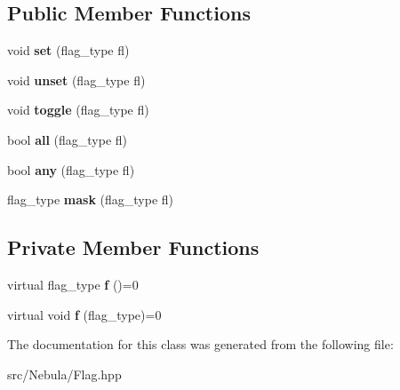 \subsection*{\-Public \-Member \-Functions}
\begin{DoxyCompactItemize}
\item 
\hypertarget{classgal_1_1flag_a7d3d5509b05678517670ab344d5da626}{void {\bfseries set} (flag\-\_\-type fl)}\label{classgal_1_1flag_a7d3d5509b05678517670ab344d5da626}

\item 
\hypertarget{classgal_1_1flag_a367bae4fc3adab807aa7e6df1b20b517}{void {\bfseries unset} (flag\-\_\-type fl)}\label{classgal_1_1flag_a367bae4fc3adab807aa7e6df1b20b517}

\item 
\hypertarget{classgal_1_1flag_a8bffab2a607799d0c944f2caf594ee19}{void {\bfseries toggle} (flag\-\_\-type fl)}\label{classgal_1_1flag_a8bffab2a607799d0c944f2caf594ee19}

\item 
\hypertarget{classgal_1_1flag_a35c2d1efbc26977cc4f949ee447064ca}{bool {\bfseries all} (flag\-\_\-type fl)}\label{classgal_1_1flag_a35c2d1efbc26977cc4f949ee447064ca}

\item 
\hypertarget{classgal_1_1flag_af474ea5b722c2d853d4182e4b30b388f}{bool {\bfseries any} (flag\-\_\-type fl)}\label{classgal_1_1flag_af474ea5b722c2d853d4182e4b30b388f}

\item 
\hypertarget{classgal_1_1flag_ae7783c09ba627e5c78cb89b7b45e86d4}{flag\-\_\-type {\bfseries mask} (flag\-\_\-type fl)}\label{classgal_1_1flag_ae7783c09ba627e5c78cb89b7b45e86d4}

\end{DoxyCompactItemize}
\subsection*{\-Private \-Member \-Functions}
\begin{DoxyCompactItemize}
\item 
\hypertarget{classgal_1_1flag_abac6a7ca950ba7e95b20ac64abbd7bdd}{virtual flag\-\_\-type {\bfseries f} ()=0}\label{classgal_1_1flag_abac6a7ca950ba7e95b20ac64abbd7bdd}

\item 
\hypertarget{classgal_1_1flag_ab22ce33d5b35eb8c0283b3720f8bc0ce}{virtual void {\bfseries f} (flag\-\_\-type)=0}\label{classgal_1_1flag_ab22ce33d5b35eb8c0283b3720f8bc0ce}

\end{DoxyCompactItemize}


\-The documentation for this class was generated from the following file\-:\begin{DoxyCompactItemize}
\item 
src/\-Nebula/\-Flag.\-hpp\end{DoxyCompactItemize}
